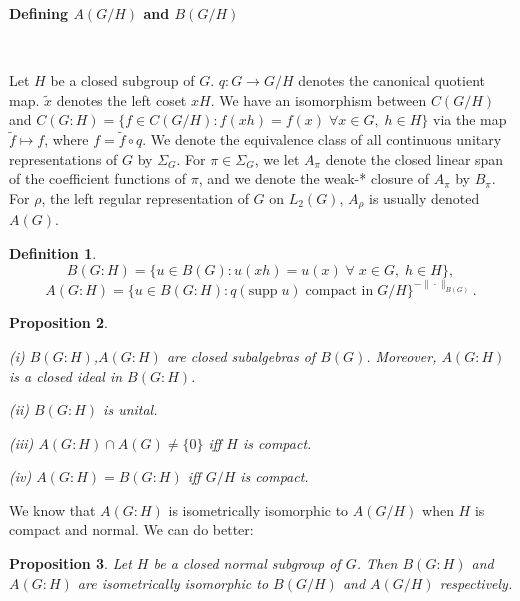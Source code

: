 \documentclass[landscape]{slides}
\newtheorem{defn}{Definition}
\newtheorem{prop}[defn]{Proposition}
\begin{document}
\begin{slide}
\textbf{Defining $A(G/H)$ and $B(G/H)$}

\\
\begin{small}
Let $H$ be a closed subgroup of $G$.  $q : G \rightarrow G/H$ denotes the canonical quotient map.
$\tilde{x}$ denotes the left coset $xH$.  We have an isomorphism between
$C(G/H)$ and $C(G:H)= \{f\in C(G/H):f(xh) = f(x)\;\forall x\in G,\;h\in H\}$
via the map $\tilde{f} \mapsto f$, where $f = \tilde{f}\circ q$.
We denote the equivalence class of all continuous unitary
representations of $G$ by $\Sigma_G$.  For $\pi \in \Sigma_G$, we let $A_\pi$ denote the closed linear
span of the coefficient functions of $\pi$, and we denote the weak-* closure of $A_\pi$ by $B_\pi$.
For $\rho$, the left regular representation of $G$ on $L_2 (G)$, $A_\rho$ is usually denoted $A(G)$.
\end{small}

\begin{defn}
$$B(G:H) = \{u\in B(G):u(xh) = u(x)\;\forall\;x\in G,\;h \in H\},$$
$$A(G:H) = \{u\in B(G:H): q(\text{supp}\;u)\;\text{compact in}\;G/H\}^{-\|\cdot\|_{B(G)}}.$$
\end{defn}
\end{slide}

\begin{slide}
\begin{prop}
\begin{list}{}{\itemsep -4pt}
\item[(i)] $B(G:H)$,$A(G:H)$ are closed subalgebras of $B(G)$.  Moreover, $A(G:H)$ is a closed ideal in 
$B(G:H)$.
\item[(ii)] $B(G:H)$ is unital.
\item[(iii)] $A(G:H)\cap A(G) \neq \{0\}$ iff $H$ is compact.
\item[(iv)] $A(G:H) = B(G:H)$ iff $G/H$ is compact.
\end{list}
\end{prop}

We know that $A(G:H)$ is isometrically isomorphic to $A(G/H)$ when $H$ is compact
and normal.  We can do better:

\begin{prop}
Let $H$ be a closed normal subgroup of $G$.  Then $B(G:H)$ and $A(G:H)$ are isometrically
isomorphic to $B(G/H)$ and $A(G/H)$ respectively.
\end{prop}
\end{slide}
\end{document}
